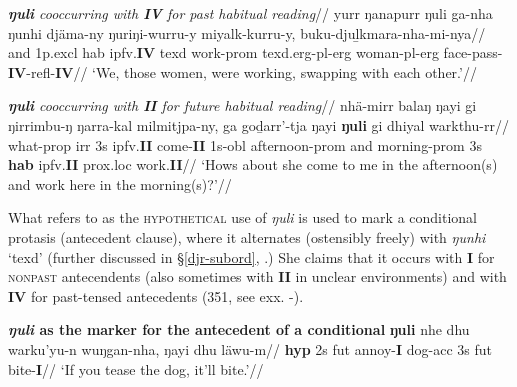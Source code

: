  \a{}\begingl\glpreamble\textit{\textbf{ŋuli} cooccurring with \textbf{IV} for past habitual reading}//
\gla yurr ŋanapurr ŋuli ga-nha ŋunhi djäma-ny ŋuriŋi-wurru-y miyalk-kurru-y, buku-djuḻkmara-nha-mi-nya//
\glb and 1p.\gls{excl} \gls{hab} \gls{ipfv}.\textbf{IV} \gls{texd} work-\gls{prom} \gls{texd}.\gls{erg}-\gls{pl}-\gls{erg} woman-\gls{pl}-\gls{erg} face-pass-\textbf{IV}-\gls{refl}-\textbf{IV}//
\glft`We, those women, were working, swapping with each other.'//\endgl{}

\a{}\begingl\glpreamble\textit{\textbf{ŋuli} cooccurring with \textbf{II} for future habitual reading}//
\gla nhä-mirr balaŋ ŋayi gi ŋirrimbu-ŋ ŋarra-kal milmitjpa-ny, ga goḏarr'-tja ŋayi \textbf{ŋuli} gi dhiyal warkthu-rr//
\glb what-\gls{prop} \gls{irr} 3s \gls{ipfv}.\textbf{II} come-\textbf{II} 1s-\gls{obl} afternoon-\gls{prom} and morning-\gls{prom} 3s \textbf{\gls{hab}} \gls{ipfv}.\textbf{II} \gls{prox}.\gls{loc} work.\textbf{II}//
\glft`Hows about she come to me in the afternoon(s) and work here in the morning(s)?'//\endgl
\xe

What \citet{Wilkinson1991} refers to as the \textsc{hypothetical} use of \textit{ŋuli} is used to mark a conditional protasis (antecedent clause), where it alternates (ostensibly freely) with \textit{ŋunhi} `\gls{texd}' (further discussed in §\ref{djr-subord}, \citealp[see also][667]{Wilkinson1991}.) She claims that it occurs with \textbf{I} for \textsc{nonpast} antecendents (also sometimes with \textbf{II} in unclear environments) and with \textbf{IV} for past-tensed antecedents (351, see exx. -).

\pex \textbf{\textit{ŋuli} as the marker for the antecedent of a conditional}
\a{}\begingl\gla \textbf{ŋuli} nhe dhu warku'yu-n wuŋgan-nha, ŋayi dhu läwu-m//
\glb \textbf{\gls{hyp}} 2s \gls{fut} annoy-\textbf{I} dog-\gls{acc} 3s \gls{fut} bite-\textbf{I}//
\glft`If you tease the dog, it'll bite.'//
\endgl


